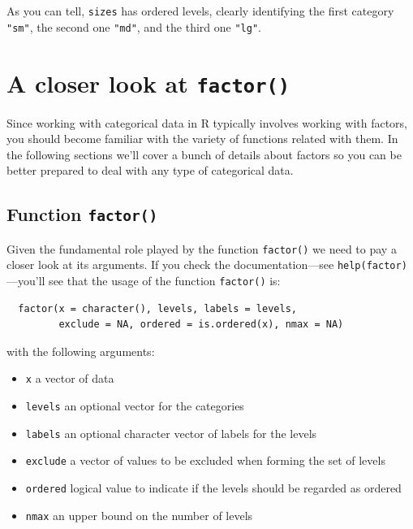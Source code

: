 \documentclass[
]{book}
\begin{document}
As you can tell, \texttt{sizes} has ordered levels, clearly identifying the first
category \texttt{"sm"}, the second one \texttt{"md"}, and the third one \texttt{"lg"}.

\hypertarget{a-closer-look-at-factor}{%
\section{\texorpdfstring{A closer look at \texttt{factor()}}{A closer look at factor()}}\label{a-closer-look-at-factor}}

Since working with categorical data in R typically involves working with factors,
you should become familiar with the variety of functions related with them. In
the following sections we'll cover a bunch of details about factors so you can
be better prepared to deal with any type of categorical data.

\hypertarget{function-factor}{%
\subsection{\texorpdfstring{Function \texttt{factor()}}{Function factor()}}\label{function-factor}}

Given the fundamental role played by the function \texttt{factor()} we need to pay a
closer look at its arguments. If you check the documentation---see
\texttt{help(factor)}---you'll see that the usage of the function \texttt{factor()} is:

\begin{verbatim}
  factor(x = character(), levels, labels = levels,
         exclude = NA, ordered = is.ordered(x), nmax = NA)
\end{verbatim}

with the following arguments:

\begin{itemize}
\item
  \texttt{x} a vector of data
\item
  \texttt{levels} an optional vector for the categories
\item
  \texttt{labels} an optional character vector of labels for the levels
\item
  \texttt{exclude} a vector of values to be excluded when forming the set of levels
\item
  \texttt{ordered} logical value to indicate if the levels should be regarded as ordered
\item
  \texttt{nmax} an upper bound on the number of levels
\end{itemize}
\end{document}
